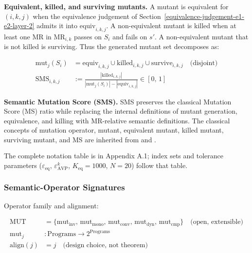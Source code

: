 \documentclass[manuscript,screen,review]{acmart}
\begin{document}
\textbf{Equivalent, killed, and surviving mutants.} A mutant is
equivalent for \((i,k,j)\) when the equivalence judgement of Section~\ref{equivalence-judgement-e1-e2-layer-2} admits
it into \(\mathrm{equiv}_{i,k,j}\). A non-equivalent mutant is killed when
at least one MR in \(\mathrm{MR}_{i,k}\) passes on \(S_i\) and fails on
\(s'\). A non-equivalent mutant that is not killed is surviving. Thus
the generated mutant set decomposes as:

\begin{align*}
\mathrm{mut}_j(S_i) &= \mathrm{equiv}_{i,k,j} \cup \mathrm{killed}_{i,k,j} \cup \mathrm{survive}_{i,k,j} \quad \text{(disjoint)} \\
\mathrm{SMS}_{i,k,j} &:= \frac{|\mathrm{killed}_{i,k,j}|}{|\mathrm{mut}_j(S_i)| - |\mathrm{equiv}_{i,k,j}|} \in [0,\,1]
\end{align*}

\textbf{Semantic Mutation Score (SMS).} SMS preserves the classical
Mutation Score (MS) ratio while replacing the internal definitions of
mutant generation, equivalence, and killing with MR-relative semantic
definitions. The classical concepts of mutation operator, mutant,
equivalent mutant, killed mutant, surviving mutant, and MS are inherited
from \citet{d7c38286734419b52de4262c9802ebdfcf4b9447} and
\citet{ammann2008introduction}.

The complete notation table is in Appendix A.1; index sets and tolerance
parameters ($\varepsilon_{\mathrm{eq}}$, $\varepsilon_{\mathrm{AVP}}^k$,
$K_{\mathrm{eq}} = 1000$, $N = 20$) follow that table.

\subsubsection{Semantic-Operator Signatures}\label{operator-signatures}

Operator family and alignment:

\begin{align*}
\mathrm{MUT} &= \{\mathrm{mut}_{\mathrm{inv}},\, \mathrm{mut}_{\mathrm{mono}},\, \mathrm{mut}_{\mathrm{conv}},\, \mathrm{mut}_{\mathrm{dyn}},\, \mathrm{mut}_{\mathrm{cmp}}\} \quad \text{(open, extensible)} \\
\mathrm{mut}_j &: \text{Programs} \to 2^{\text{Programs}} \\
\mathrm{align}(j) &= j \quad \text{(design choice, not theorem)}
\end{align*}
\end{document}
